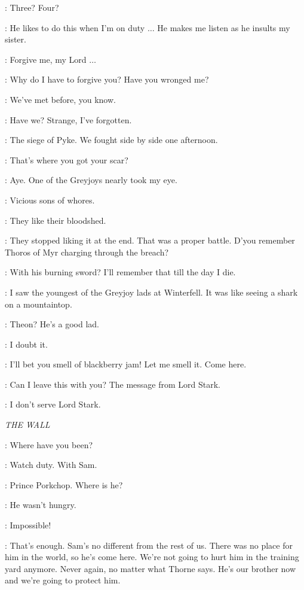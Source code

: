 \JORY: Three? Four? 

\JAIME: He likes to do this when I'm on duty $\ldots$ He makes me listen as he insults my sister. 

\JORY: Forgive me, my Lord $\ldots$ 

\JAIME: Why do I have to forgive you? Have you wronged me? 

\JORY: We've met before, you know. 

\JAIME: Have we? Strange, I've forgotten. 

\JORY: The siege of Pyke. We fought side by side one afternoon. 

\JAIME: That's where you got your scar? 

\JORY: Aye. One of the Greyjoys nearly took my eye. 

\JAIME: Vicious sons of whores. 

\JORY: They like their bloodshed. 

\JAIME: They stopped liking it at the end. That was a proper battle. D'you remember Thoros of Myr charging through the breach? 

\JORY: With his burning sword? I'll remember that till the day I die. 

\JAIME: I saw the youngest of the Greyjoy lads at Winterfell. It was like seeing a shark on a mountaintop. 

\JORY: Theon? He's a good lad. 

\JAIME: I doubt it. 

\ROBERT:  I'll bet you smell of blackberry jam! Let me smell it. Come here. 

\JORY: Can I leave this with you? The message from Lord Stark. 

\JAIME: I don't serve Lord Stark. 

\scene

\textit{THE WALL}


\GRENN: Where have you been? 

\JON: Watch duty. With Sam. 

\PYP: Prince Porkchop. Where is he? 

\JON: He wasn't hungry. 

\PYP: Impossible! 

\JON: That's enough. Sam's no different from the rest of us. There was no place for him in the world, so he's come here. We're not going to hurt him in the training yard anymore. Never again, no matter what Thorne says. He's our brother now and we're going to protect him. 

